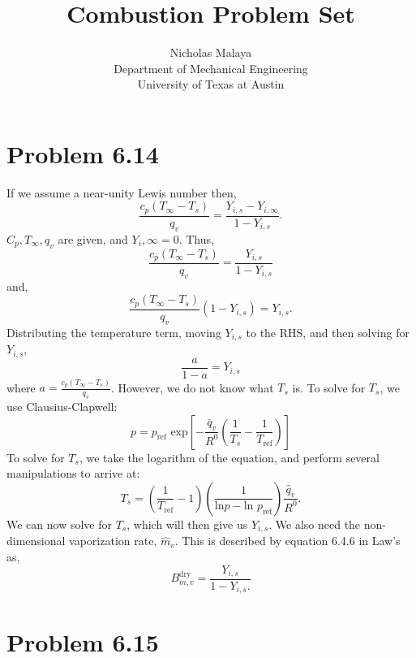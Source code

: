 \documentclass{article}
\title{\bf{Combustion Problem Set}}
\author{Nicholas Malaya\\ Department of Mechanical Engineering \\
University of Texas at Austin}
\date{}
\begin{document}
\maketitle

\newpage
\section*{Problem 6.14}

If we assume a near-unity Lewis number then,
\begin{equation}
\frac{c_p (T_\infty - T_s)}{q_v} = \frac{Y_{i,s} - Y_{i,\infty}}{1-Y_{i,s}}.
\end{equation}
$C_p,T_\infty, q_v$ are given, and $Y_i,\infty=0$. Thus, 
\begin{equation}
\frac{c_p (T_\infty - T_s)}{q_v} = \frac{Y_{i,s}}{1-Y_{i,s}}
\end{equation}
and, 
\begin{equation}
\frac{c_p (T_\infty - T_s)}{q_v} (1-Y_{i,s}) = Y_{i,s}.
\end{equation}
Distributing the temperature term, moving $Y_{i,s}$ to the RHS, and then
solving for $Y_{i,s}$, 
\begin{equation}
\frac{a}{1-a} = Y_{i,s}
\end{equation}
where $a=\frac{c_p (T_\infty - T_s)}{q_v}$. However, we do not know what
$T_s$ is. To solve for $T_s$, we use Clausius-Clapwell:
\begin{equation}
 p = p_{\text{ref}}\text{ exp}\left[-\frac{\bar q_v}{R^0}\left(\frac{1}{T_s}-\frac{1}{T_{\text{ref}}}\right)\right]
\end{equation}
To solve for $T_s$, we take the logarithm of the equation, and perform
several manipulations to arrive at:
\begin{equation}
 T_s = \left(\frac{1}{T_{\text{ref}}} - 1 \right)
  \left(\frac{1}{\text{ln}p - \text{ln }p_{\text{ref}}}\right)
  \frac{\hat q_v}{R^0}. 
\end{equation}
We can now solve for $T_s$, which will then give us $Y_{i,s}$. We also
need the non-dimensional vaporization rate, $\hat m_v$. This is
described by equation 6.4.6 in Law's as, 
\begin{equation}
 B^{\text{dry}}_{m,v} = \frac{Y_{i,s}}{1-Y_{i,s}.}
\end{equation}

%
%
%
%
%
\newpage
\section*{Problem 6.15}
\end{document}
